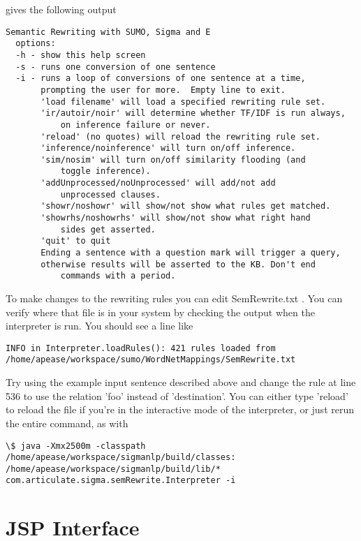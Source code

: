\documentclass{book}
\begin{document}
gives the following output

\begin{verbatim}
Semantic Rewriting with SUMO, Sigma and E
  options:
  -h - show this help screen
  -s - runs one conversion of one sentence
  -i - runs a loop of conversions of one sentence at a time,
       prompting the user for more.  Empty line to exit.
       'load filename' will load a specified rewriting rule set.
       'ir/autoir/noir' will determine whether TF/IDF is run always, 
           on inference failure or never.
       'reload' (no quotes) will reload the rewriting rule set.
       'inference/noinference' will turn on/off inference.
       'sim/nosim' will turn on/off similarity flooding (and 
           toggle inference).
       'addUnprocessed/noUnprocessed' will add/not add 
           unprocessed clauses.
       'showr/noshowr' will show/not show what rules get matched.
       'showrhs/noshowrhs' will show/not show what right hand 
           sides get asserted.
       'quit' to quit
       Ending a sentence with a question mark will trigger a query,
       otherwise results will be asserted to the KB. Don't end 
           commands with a period.
\end{verbatim}

To make changes to the rewriting rules you can edit SemRewrite.txt .  You can verify
where that file is in your system by checking the output when the interpreter is run.
You should see a line like

\begin{verbatim}
INFO in Interpreter.loadRules(): 421 rules loaded from 
/home/apease/workspace/sumo/WordNetMappings/SemRewrite.txt
\end{verbatim}

Try using the example input sentence described above and change the rule at line 536
to use the relation 'foo' instead of 'destination'.  You can either type 'reload'
to reload the file if you're in the interactive mode of the interpreter, or just rerun
the entire command, as with

\begin{verbatim}
\$ java -Xmx2500m -classpath /home/apease/workspace/sigmanlp/build/classes:
/home/apease/workspace/sigmanlp/build/lib/*  
com.articulate.sigma.semRewrite.Interpreter -i
\end{verbatim}

\section{JSP Interface}
\label{chap:KnowEngi:sec:JSPInterface}
\end{document}
